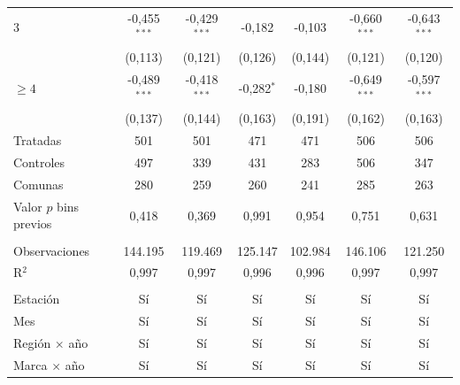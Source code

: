 \begin{tabular}{lcccccc}
   $3$                    & -0{,}455$^{***}$ & -0{,}429$^{***}$ & -0{,}182         & -0{,}103         & -0{,}660$^{***}$ & -0{,}643$^{***}$\\   
                          & (0{,}113)        & (0{,}121)        & (0{,}126)        & (0{,}144)        & (0{,}121)        & (0{,}120)\\   
   $\geq 4$               & -0{,}489$^{***}$ & -0{,}418$^{***}$ & -0{,}282$^{*}$   & -0{,}180         & -0{,}649$^{***}$ & -0{,}597$^{***}$\\   
                          & (0{,}137)        & (0{,}144)        & (0{,}163)        & (0{,}191)        & (0{,}162)        & (0{,}163)\\   
   Tratadas               & 501            & 501            & 471            & 471            & 506            & 506\\  
   Controles              & 497            & 339            & 431            & 283            & 506            & 347\\  
   Comunas                & 280            & 259            & 260            & 241            & 285            & 263\\  
   Valor $p$ bins previos & 0{,}418          & 0{,}369          & 0{,}991          & 0{,}954          & 0{,}751          & 0{,}631\\  
    \\
   Observaciones          & 144.195        & 119.469        & 125.147        & 102.984        & 146.106        & 121.250\\  
   R$^2$                  & 0{,}997          & 0{,}997          & 0{,}996          & 0{,}996          & 0{,}997          & 0{,}997\\  
    \\
   Estación               & Sí             & Sí             & Sí             & Sí             & Sí             & Sí\\  
   Mes                    & Sí             & Sí             & Sí             & Sí             & Sí             & Sí\\  
   Región $\times$ año    & Sí             & Sí             & Sí             & Sí             & Sí             & Sí\\  
   Marca $\times$ año     & Sí             & Sí             & Sí             & Sí             & Sí             & Sí\\  
   \bottomrule
\end{tabular}
\par\endgroup
